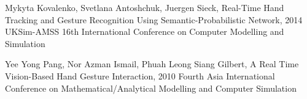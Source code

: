 \documentclass[11pt]{report}
\begin{document}
\begin{thebibliography}{999}
     Mykyta Kovalenko, Svetlana Antoshchuk, Juergen Sieck, Real-Time Hand Tracking and Gesture Recognition Using Semantic-Probabilistic Network, 2014 UKSim-AMSS 16th International Conference on Computer Modelling and Simulation
    
     Yee Yong Pang, Nor Azman Ismail, Phuah Leong Siang Gilbert, A Real Time Vision-Based Hand Gesture Interaction, 2010 Fourth Asia International Conference on Mathematical/Analytical Modelling and Computer Simulation
    



\end{thebibliography}
\end{document}
